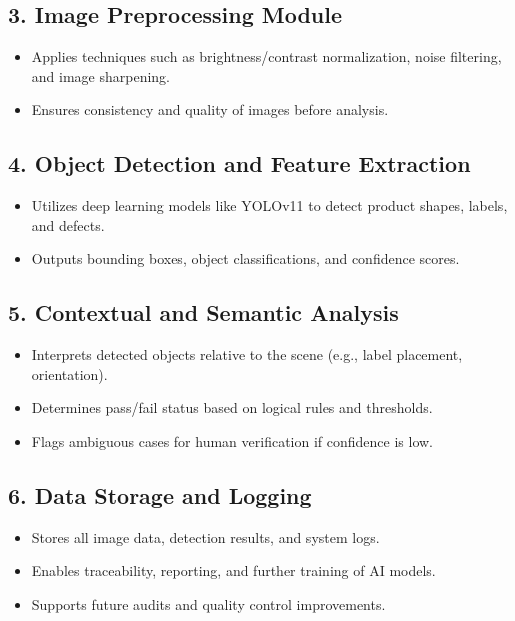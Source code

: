 \documentclass[12pt]{report}
\begin{document}
\subsection*{3. Image Preprocessing Module}
\begin{itemize}
    \item Applies techniques such as brightness/contrast normalization, noise filtering, and image sharpening.
    \item Ensures consistency and quality of images before analysis.
\end{itemize}

\subsection*{4. Object Detection and Feature Extraction}
\begin{itemize}
    \item Utilizes deep learning models like YOLOv11 to detect product shapes, labels, and defects.
    \item Outputs bounding boxes, object classifications, and confidence scores.
\end{itemize}

\subsection*{5. Contextual and Semantic Analysis}
\begin{itemize}
    \item Interprets detected objects relative to the scene (e.g., label placement, orientation).
    \item Determines pass/fail status based on logical rules and thresholds.
    \item Flags ambiguous cases for human verification if confidence is low.
\end{itemize}

\subsection*{6. Data Storage and Logging}
\begin{itemize}
    \item Stores all image data, detection results, and system logs.
    \item Enables traceability, reporting, and further training of AI models.
    \item Supports future audits and quality control improvements.
\end{itemize}
\end{document}
